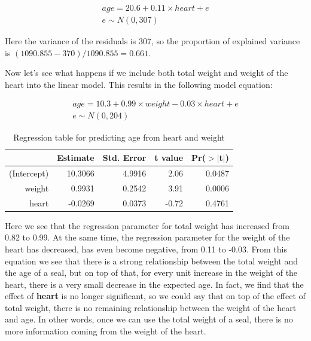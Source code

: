 \documentclass[]{book}\usepackage[]{graphicx}\usepackage[]{color}
\begin{document}
\begin{eqnarray}
age = 20.6 + 0.11 \times  heart + e \\
e \sim N(0, 307)
\end{eqnarray}





Here the variance of the residuals is 307, so the proportion of explained variance is $(1090.855-370)/1090.855  = 0.661$.


Now let's see what happens if we include both total weight and weight of the heart into the linear model. This results in the following model equation:


\begin{eqnarray}
age = 10.3 + 0.99 \times  weight  -0.03 \times  heart + e \\
e \sim N(0, 204)
\end{eqnarray}

\begin{table}[ht]
\centering
\caption{Regression table for predicting age from heart and weight} 
\label{tab:multi_2c}
\begin{tabular}{rrrrr}
  \hline
 & Estimate & Std. Error & t value & Pr($>$$|$t$|$) \\ 
  \hline
(Intercept) & 10.3066 & 4.9916 & 2.06 & 0.0487 \\ 
  weight & 0.9931 & 0.2542 & 3.91 & 0.0006 \\ 
  heart & -0.0269 & 0.0373 & -0.72 & 0.4761 \\ 
   \hline
\end{tabular}
\end{table}




Here we see that the regression parameter for total weight has increased from 0.82 to 0.99. At the same time, the regression parameter for the weight of the heart has decreased, has even become negative, from 0.11 to -0.03. From this equation we see that there is a strong relationship between the total weight and the age of a seal, but on top of that, for every unit increase in the weight of the heart, there is a very small decrease in the expected age. In fact, we find that the effect of \textbf{heart} is no longer significant, so we could say that on top of the effect of total weight, there is no remaining relationship between the weight of the heart and age. In other words, once we can use the total weight of a seal, there is no more information coming from the weight of the heart.
\end{document}
